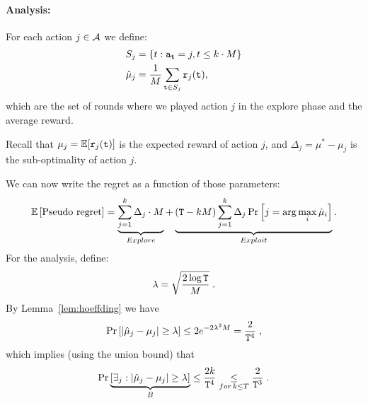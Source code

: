 
\paragraph{Analysis:}
For each action $j\in\mathcal{A}$ we define:
\begin{align*}
S_{j}&= \left\{ t:{\tt a}_{{\tt t}}=j,t\le k\cdot M\right\}\\
\hat{\mu}_{j}&=\frac{1}{M} \sum_{{\tt t}\in S_{j}}{\tt r}_{j}({\tt t}),
\end{align*}
which are the set of rounds where we played action $j$ in the explore phase and the average reward.

Recall that 
$\mu_{j}=\mathbb{E}[{\tt r}_{j}({\tt t})]$ is the expected reward of action $j$, and 
$
\Delta_{j}=\mu^{*}-\mu_{j}$ is the sub-optimality of action $j$.

We can now write the regret as a function of those parameters:
\[
\mathbb{E}\left[\text{Pseudo regret}\right]=\underbrace{
\sum_{j=1}^{k}\Delta_{j}\cdot
M}_{Explore}+\underbrace{\left({\tt T}-k M\right)
\sum_{j=1}^{k}\Delta_{j}\Pr\left[j=\arg\max_{i}\hat{\mu}_{i}\right]}_{Exploit}.
\]
For the analysis, define:
\[
\lambda=\sqrt{\frac{2\log {\tt T}}{M}}\;.
\]
By Lemma~\ref{lem:hoeffding} we have
\[
\Pr\left[\left|\hat{\mu}_{j}-\mu_{j}\right|\ge\lambda\right]  \le
2e^{-2\lambda^2 M}=\frac{2}{{\tt T}^{4}}\;,
\]
which implies (using the union bound) that
\[
\Pr\underbrace{\left[\exists_{j}:\left|\hat{\mu}_{j}-\mu_{j}\right|\ge\lambda\right]}_{B}
 \le  \frac{2k}{{\tt T}^{4}}\underset{for\,k\leq T}{\leq}\frac{2}{{\tt T}^{3}}\;.
\]

